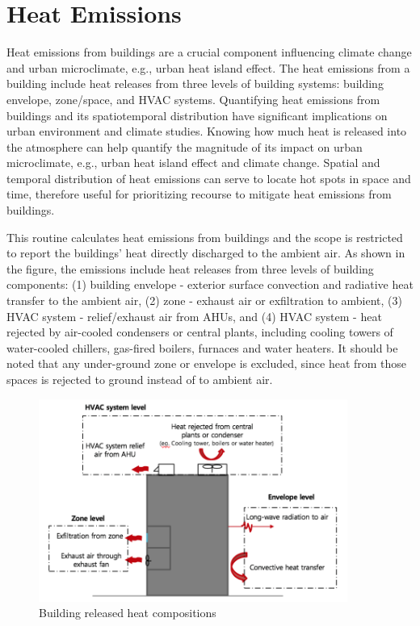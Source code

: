 \section{Heat Emissions}\label{heat-emissions}

Heat emissions from buildings are a crucial component influencing climate change and urban microclimate, e.g., urban heat island effect. The heat emissions from a building include heat releases from three levels of building systems: building envelope, zone/space, and HVAC systems. Quantifying heat emissions from buildings and its spatiotemporal distribution have significant implications on urban environment and climate studies. Knowing how much heat is released into the atmosphere can help quantify the magnitude of its impact on urban microclimate, e.g., urban heat island effect and climate change. Spatial and temporal distribution of heat emissions can serve to locate hot spots in space and time, therefore useful for prioritizing recourse to mitigate heat emissions from buildings.

This routine calculates heat emissions from buildings and the scope is restricted to report the buildings’ heat directly discharged to the ambient air. As shown in the figure, the emissions include heat releases from three levels of building components: (1) building envelope - exterior surface convection and radiative heat transfer to the ambient air, (2) zone - exhaust air or exfiltration to ambient, (3) HVAC system - relief/exhaust air from AHUs, and (4) HVAC system - heat rejected by air-cooled condensers or central plants, including cooling towers of water-cooled chillers, gas-fired boilers, furnaces and water heaters. It should be noted that any under-ground zone or envelope is excluded, since heat from those spaces is rejected to ground instead of to ambient air. 

\begin{figure}[hbtp] 
\centering
\includegraphics[width=0.9\textwidth, height=0.9\textheight, keepaspectratio=true]{media/heatemission.png}
\caption{Building released heat compositions \protect \label{fig:building-released-heat-compositions}}
\end{figure}

